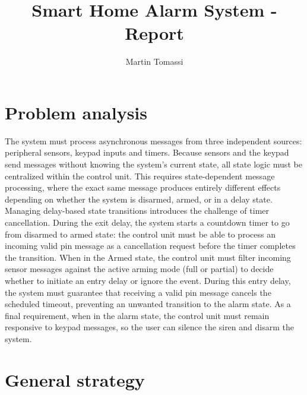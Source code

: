 \documentclass[11pt,a4paper]{article}
\title{\textbf{Smart Home Alarm System - Report}}
\author{Martin Tomassi}
\date{}
\begin{document}
\maketitle

\section{Problem analysis}

The system must process asynchronous messages from three independent sources: peripheral sensors, keypad inputs and timers. Because sensors and the keypad send messages without knowing the system’s current state, all state logic must be centralized within the control unit. This requires state-dependent message processing, where the exact same message produces entirely different effects depending on whether the system is disarmed, armed, or in a delay state. Managing delay-based state transitions introduces the challenge of timer cancellation. During the exit delay, the system starts a countdown timer to go from disarmed to armed state: the control unit must be able to process an incoming valid pin message as a cancellation request before the timer completes the transition. When in the Armed state, the control unit must filter incoming sensor messages against the active arming mode (full or partial) to decide whether to initiate an entry delay or ignore the event. During this entry delay, the system must guarantee that receiving a valid pin message cancels the scheduled timeout, preventing an unwanted transition to the alarm state. As a final requirement, when in the alarm state, the control unit must remain responsive to keypad messages, so the user can silence the siren and disarm the system.

\section{General strategy}
\end{document}
